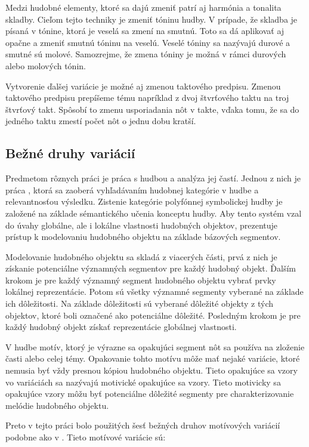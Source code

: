 Medzi hudobné elementy, ktoré sa dajú zmeniť patrí aj harmónia a tonalita skladby. Cieľom tejto techniky je zmeniť tóninu hudby. V prípade, že skladba je písaná v tónine, ktorá je veselá sa zmení na smutnú. Toto sa dá aplikovať aj opačne a zmeniť smutnú tóninu na veselú. Veselé tóniny sa nazývajú durové a smutné sú molové. Samozrejme, že zmena tóniny je možná v rámci durových alebo molových tónin.

Vytvorenie ďalšej variácie je možné aj zmenou taktového predpisu. Zmenou taktového predpisu prepíšeme tému napríklad z dvoj štvrťového taktu na troj štvrťový takt. Spôsobí to zmenu usporiadania nôt v takte, vďaka tomu, že sa do jedného taktu zmestí počet nôt o jednu dobu kratší.

\subsection{Bežné druhy variácií}
Predmetom rôznych práci je práca s hudbou a analýza jej častí. Jednou z nich je práca \cite{variationRelevance}, ktorá sa zaoberá vyhľadávaním hudobnej kategórie v hudbe a relevantnosťou výsledku. Zistenie kategórie polyfónnej symbolickej hudby je založené na základe sémantického učenia konceptu hudby. Aby tento systém vzal do úvahy globálne, ale i lokálne vlastnosti hudobných objektov, prezentuje prístup k modelovaniu hudobného objektu na základe bázových segmentov. 

Modelovanie hudobného objektu sa skladá z viacerých části, prvá z nich je získanie potenciálne významných segmentov pre každý hudobný objekt. Ďalším krokom je pre každý významný segment hudobného objektu vybrať prvky lokálnej reprezentácie. Potom sú všetky významné segmenty vyberané na základe ich dôležitosti. Na základe dôležitosti sú vyberané dôležité objekty z tých objektov, ktoré boli označené ako potenciálne dôležité. Posledným krokom je pre každý hudobný objekt získať reprezentácie globálnej vlastnosti.

V hudbe motív, ktorý je výrazne sa opakujúci segment nôt sa používa na zloženie časti alebo celej témy. Opakovanie tohto motívu môže mať nejaké variácie, ktoré nemusia byť vždy presnou kópiou hudobného objektu. Tieto opakujúce sa vzory vo variáciách sa nazývajú motivické opakujúce sa vzory. Tieto motivicky sa opakujúce vzory môžu byť potenciálne dôležité segmenty pre charakterizovanie melódie hudobného objektu.  

Preto v tejto práci bolo použitých šesť bežných druhov motívových variácií podobne ako v \cite{variationRelevance}. Tieto motívové variácie sú: 


